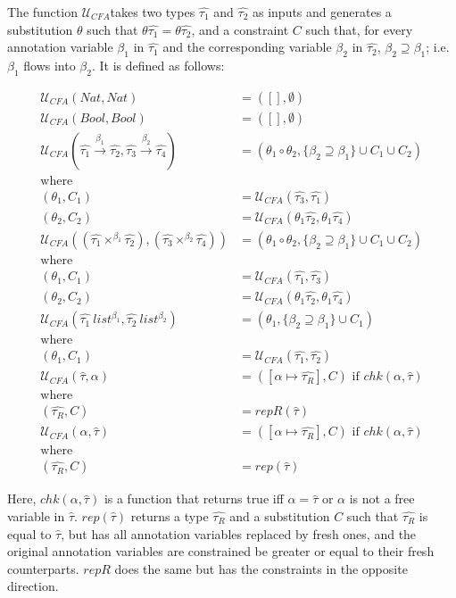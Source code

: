 \documentclass[a4paper,11pt]{article}
\newcommand{\bigU}{\ensuremath{\mathcal{U}_{CFA}}}
\begin{document}
The function \bigU takes two types $\hat{\tau_1}$ and $\hat{\tau_2}$ as inputs and generates a substitution $\theta$ such that $\theta\hat{\tau_1} = \theta \hat{\tau_2}$, and a constraint $C$ such that, for every annotation variable $\beta_1$ in $\hat{\tau_1}$ and the corresponding variable $\beta_2$ in $\hat{\tau_2}$, $\beta_2 \supseteq \beta_1$; i.e. $\beta_1$ flows into $\beta_2$. It is defined as follows:

\begin{align*}
\bigU (Nat, Nat) &= ([], \emptyset) \\
\bigU (Bool, Bool) &= ([], \emptyset) \\
\bigU (\hat{\tau_1} \xrightarrow{\beta_1} \hat{\tau_2}, \hat{\tau_3} \xrightarrow{\beta_2} \hat{\tau_4}) &= (\theta_1 \circ \theta_2, \{\beta_2 \supseteq \beta_1\} \cup C_1 \cup C_2)\\
\text{where}\\
(\theta_1,C_1) &= \bigU (\hat{\tau_3},\hat{\tau_1})\\
(\theta_2,C_2) &= \bigU (\theta_1\hat{\tau_2},\theta_1\hat{\tau_4})\\
\bigU ((\hat{\tau_1} \times^{\beta_1} \hat{\tau_2}),(\hat{\tau_3} \times^{\beta_2} \hat{\tau_4})) &= (\theta_1 \circ  \theta_2, \{\beta_2 \supseteq \beta_1\} \cup C_1 \cup C_2)\\
\text{where}\\
(\theta_1,C_1) &= \bigU (\hat{\tau_1},\hat{\tau_3})\\
(\theta_2,C_2) &= \bigU (\theta_1\hat{\tau_2},\theta_1\hat{\tau_4})\\
\bigU (\hat{\tau_1} ~ list^{\beta_1}, \hat{\tau_2} ~ list^{\beta_2}) &= (\theta_1, \{\beta_2 \supseteq \beta_1\} \cup C_1)\\
\text{where}\\
(\theta_1, C_1) &= \bigU (\hat{\tau_1}, \hat{\tau_2})\\
\bigU (\hat{\tau}, \alpha) &= ([\alpha \mapsto \hat{\tau_R}], C)\text{ if }chk(\alpha, \hat{\tau})\\
\text{where}\\
(\hat{\tau_R}, C) &= repR(\hat{\tau})\\
\bigU (\alpha, \hat{\tau}) &= ([\alpha \mapsto \hat{\tau_R}], C)\text{ if }chk (\alpha, \hat{\tau})\\
\text{where}\\
(\hat{\tau_R}, C) &= rep(\hat{\tau}) 
\end{align*}

Here, $chk (\alpha, \hat{\tau})$ is a function that returns true iff $\alpha = \hat{\tau}$ or $\alpha$ is not a free variable in $\hat{\tau}$.
$rep (\hat{\tau})$ returns a type $\hat{\tau_R}$ and a substitution $C$ such that $\hat{\tau_R}$ is equal to $\hat{\tau}$, but has all annotation variables replaced by fresh ones, and the original annotation variables are constrained be greater or equal to their fresh counterparts. $repR$ does the same but has the constraints in the opposite direction.
\end{document}
